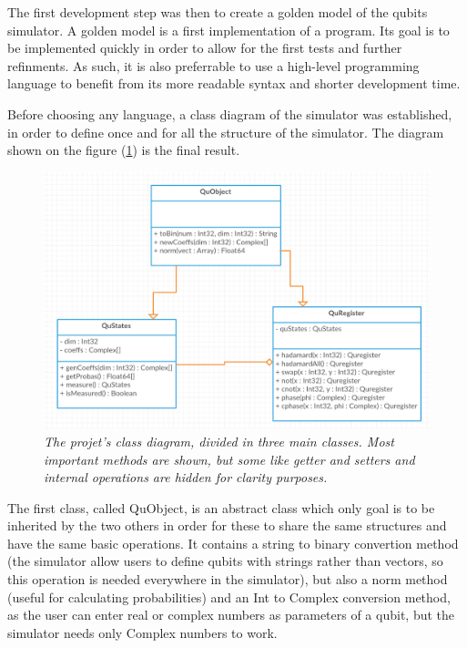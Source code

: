 \documentclass[a4paper,12pt]{report}
\newcommand{\para}[1]{\par{#1}\\}
\begin{document}
\para{
    The first development step was then to create a golden model of the qubits simulator. A golden model is a first implementation of a program. Its goal is to be implemented quickly in order to allow for the first tests and further refinments. As such, it is also preferrable to use a high-level programming language to benefit from its more readable syntax and shorter development time.
}

\para{
    Before choosing any language, a class diagram of the simulator was established, in order to define once and for all the structure of the simulator. The diagram shown on the figure (\ref{class-diagram}) is the final result.
}

\begin{figure}
	\begin{center}
		\includegraphics[scale=0.6]{images/class-diagram}
	\end{center}
	\caption{\textit{The projet's class diagram, divided in three main classes. Most important methods are shown, but some like getter and setters and internal operations are hidden for clarity purposes.}}
	\label{class-diagram}
\end{figure}

\para{
    The first class, called QuObject, is an abstract class which only goal is to be inherited by the two others in order for these to share the same structures and have the same basic operations. It contains a string to binary convertion method (the simulator allow users to define qubits with strings rather than vectors, so this operation is needed everywhere in the simulator), but also a norm method (useful for calculating probabilities) and an Int to Complex conversion method, as the user can enter real or complex numbers as parameters of a qubit, but the simulator needs only Complex numbers to work.
}
\end{document}
